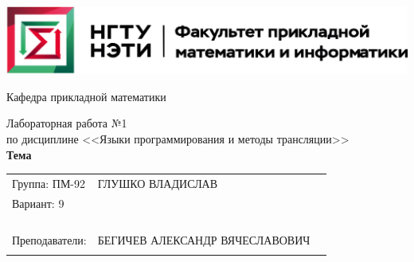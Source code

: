 \documentclass[12pt,a4paper]{article}
\begin{document}
\begin{center}
\begin{large}
\vspace{12mm}




\vspace{4mm}

\includegraphics[scale=0.8]{pic/logo_fami}

\vspace{12mm}


Кафедра прикладной математики

\vspace{4mm}


Лабораторная работа №1 \\ %
по дисциплине <<Языки программирования и методы трансляции>> \\ %
\bigskip
\textbf{Тема} %

\vspace{8mm}

\end{large}




\renewcommand{\arraystretch}{1.7}
\begin{tabular}{lll}
Группа:     ПМ-92   &   \uppercase{Глушко Владислав} \\
Вариант:    9       &   \uppercase{} \\
                    &   \uppercase{} \\
                    &   \uppercase{} \\
                    &   \uppercase{} \\
                    &                \\
Преподаватели:      &   \uppercase{Бегичев Александр Вячеславович} \\
                    &   \uppercase{} \\
\end{tabular}
\renewcommand{\arraystretch}{1.0}


\end{center}
\end{document}
